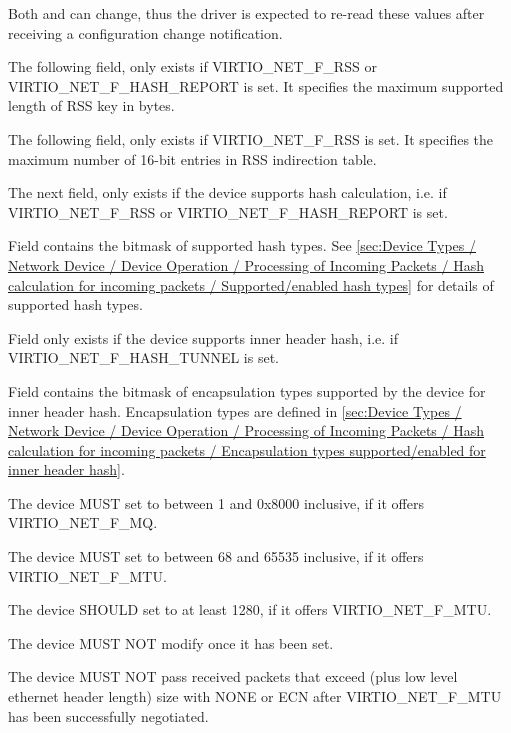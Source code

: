 Both  and  can change, thus the driver
is expected to re-read these values after receiving a
configuration change notification.

The following field,  only exists if VIRTIO_NET_F_RSS or VIRTIO_NET_F_HASH_REPORT is set.
It specifies the maximum supported length of RSS key in bytes.

The following field,  only exists if VIRTIO_NET_F_RSS is set.
It specifies the maximum number of 16-bit entries in RSS indirection table.

The next field,  only exists if the device supports hash calculation,
i.e. if VIRTIO_NET_F_RSS or VIRTIO_NET_F_HASH_REPORT is set.

Field  contains the bitmask of supported hash types.
See \ref{sec:Device Types / Network Device / Device Operation / Processing of Incoming Packets / Hash calculation for incoming packets / Supported/enabled hash types} for details of supported hash types.

Field  only exists if the device supports inner header hash, i.e. if VIRTIO_NET_F_HASH_TUNNEL is set.

Field  contains the bitmask of encapsulation types supported by the device for inner header hash.
Encapsulation types are defined in \ref{sec:Device Types / Network Device / Device Operation / Processing of Incoming Packets /
Hash calculation for incoming packets / Encapsulation types supported/enabled for inner header hash}.


The device MUST set  to between 1 and 0x8000 inclusive,
if it offers VIRTIO_NET_F_MQ.

The device MUST set  to between 68 and 65535 inclusive,
if it offers VIRTIO_NET_F_MTU.

The device SHOULD set  to at least 1280, if it offers
VIRTIO_NET_F_MTU.

The device MUST NOT modify  once it has been set.

The device MUST NOT pass received packets that exceed  (plus low
level ethernet header length) size with  NONE or ECN
after VIRTIO_NET_F_MTU has been successfully negotiated.

